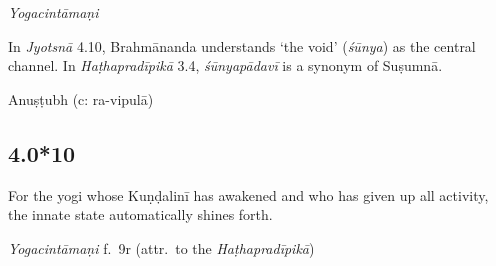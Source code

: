 \begin{ekdosis}

\begin{testimonia}[hp04_000_9]
\emph{Yogacintāmaṇi}
\begin{versinnote}
\end{versinnote}
\end{testimonia}

\begin{philcomm}[hp04_000_9]
In \emph{Jyotsnā} 4.10, Brahmānanda understands `the void' (\emph{śūnya}) as the central channel. In \emph{Haṭhapradīpikā} 3.4, \emph{śūnyapādavī} is a synonym of Suṣumnā.
\end{philcomm}

\begin{metre}[hp04_000_9]
Anuṣṭubh (c: ra-vipulā)
\end{metre}

\subsection*{4.0*10}
\begin{translation}[hp04_000_10]
For the yogi whose Kuṇḍalinī has awakened and who has given up all activity, the innate state automatically shines forth.
\end{translation}


\begin{testimonia}[hp04_000_10]
\emph{Yogacintāmaṇi} f.~9r (attr.~to the \emph{Haṭhapradīpikā})
\begin{versinnote}
\end{versinnote}
\end{testimonia}



\end{ekdosis}

